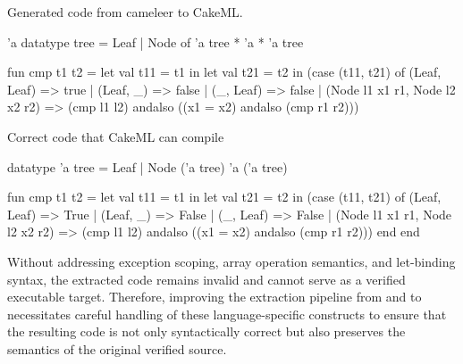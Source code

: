Generated code from cameleer to CakeML.

\begin{cakeml}
'a datatype tree = Leaf | Node of 'a tree * 'a * 'a tree

fun cmp t1 t2 = let val t11 = t1 in
  let val t21 = t2 in
  (case (t11, t21) of
    (Leaf, Leaf) => true
  | (Leaf, _) => false
  | (_, Leaf) => false
  | (Node l1 x1 r1, Node l2 x2 r2) =>
    (cmp l1 l2) andalso ((x1 = x2) andalso (cmp r1 r2)))
\end{cakeml}

Correct code that CakeML can compile

\begin{cakeml}
datatype 'a tree = Leaf | Node ('a tree) 'a ('a tree)

fun cmp t1 t2 = let val t11 = t1 in
  let val t21 = t2 in
  (case (t11, t21) of
    (Leaf, Leaf) => True
  | (Leaf, _) => False
  | (_, Leaf) => False
  | (Node l1 x1 r1, Node l2 x2 r2) =>
    (cmp l1 l2) andalso ((x1 = x2) andalso (cmp r1 r2)))
    end
  end
\end{cakeml}


Without addressing exception scoping, array operation semantics, and let-binding syntax, the extracted code remains invalid 
and cannot serve as a verified executable target. Therefore, improving the extraction pipeline from \ocaml and \gospel to 
\cml necessitates careful handling of these language-specific constructs to ensure that the resulting code is not only 
syntactically correct but also preserves the semantics of the original verified source.


